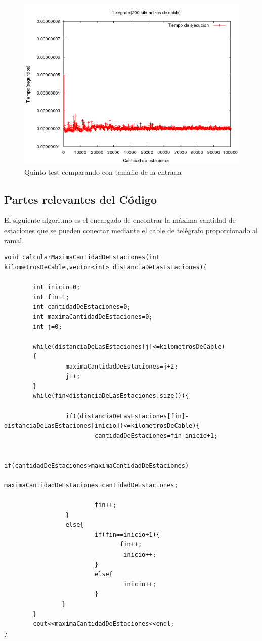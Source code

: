 \documentclass[10pt, a4paper]{article}
\begin{document}
\begin{enumerate}
	\begin{figure}[H]
  		\centering
   	 	\includegraphics[width=1\textwidth]
   	 	{Imagenes/telegrafoTiempos4Comparando.png}
		\caption{Quinto test comparando con tama\~no de la entrada}
	\end{figure}
	\end{enumerate}
\subsection{Partes relevantes del C\'odigo}
El siguiente algoritmo es el encargado de encontrar la m\'axima cantidad de estaciones que se pueden conectar mediante el cable de tel\'egrafo proporcionado al ramal.
\begin{verbatim}
void calcularMaximaCantidadDeEstaciones(int kilometrosDeCable,vector<int> distanciaDeLasEstaciones){
	    
	    int inicio=0;
	    int fin=1;
	    int cantidadDeEstaciones=0;
	    int maximaCantidadDeEstaciones=0;
	    int j=0;
	    
	    while(distanciaDeLasEstaciones[j]<=kilometrosDeCable)
	    {
		         maximaCantidadDeEstaciones=j+2;
		         j++;
	    }
	    while(fin<distanciaDeLasEstaciones.size()){
	     
		         if((distanciaDeLasEstaciones[fin]-distanciaDeLasEstaciones[inicio])<=kilometrosDeCable){
			             cantidadDeEstaciones=fin-inicio+1;
			             
			             if(cantidadDeEstaciones>maximaCantidadDeEstaciones)
				                 maximaCantidadDeEstaciones=cantidadDeEstaciones;
			
			             fin++;
		         }
		         else{
			             if(fin==inicio+1){
			                	fin++;
				                 inicio++;
			             }
			             else{
				                 inicio++;
			             }
		        }
	    }
	    cout<<maximaCantidadDeEstaciones<<endl;
}
\end{verbatim}
\end{document}
